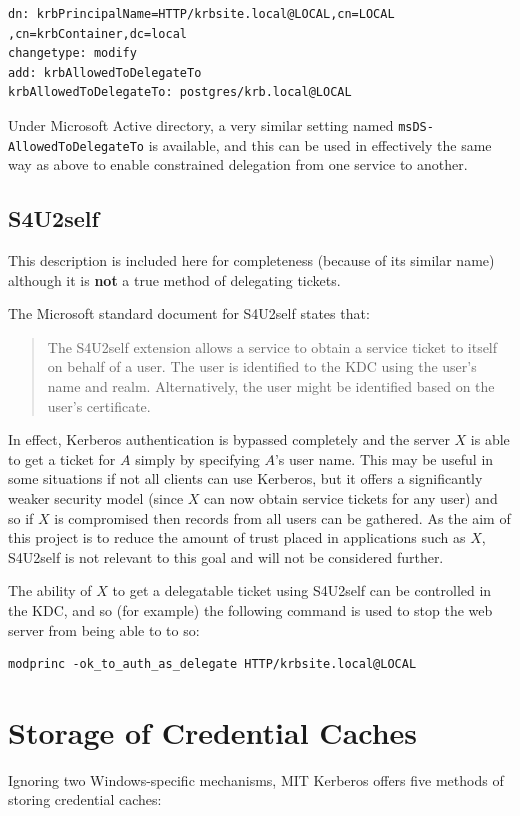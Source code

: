 \documentclass{report}
\begin{document}
\begin{verbatim}
dn: krbPrincipalName=HTTP/krbsite.local@LOCAL,cn=LOCAL
,cn=krbContainer,dc=local
changetype: modify
add: krbAllowedToDelegateTo
krbAllowedToDelegateTo: postgres/krb.local@LOCAL
\end{verbatim}

Under Microsoft Active directory, a very similar setting named \texttt{msDS-AllowedToDelegateTo} is available, and this can be used in effectively the same way as above to enable constrained delegation from one service to another\cite{MS-deleg-attribute}.

\subsection{S4U2self}
This description is included here for completeness (because of its similar name) although it is \textbf{not} a true method of delegating tickets.

The Microsoft standard document for S4U2self\cite{MS-s4u2} states that:

\begin{quote}
  The S4U2self extension allows a service to obtain a service ticket to itself on behalf of a user. The user is identified to the KDC using the user's name and realm. Alternatively, the user might be identified based on the user's certificate.
\end{quote}

In effect, Kerberos authentication is bypassed completely and the server $X$ is able to get a ticket for $A$ simply by specifying $A$'s user name. This may be useful in some situations if not all clients can use Kerberos, but it offers a significantly weaker security model (since $X$ can now obtain service tickets for any user) and so if $X$ is compromised then records from all users can be gathered. As the aim of this project is to reduce the amount of trust placed in applications such as $X$, S4U2self is not relevant to this goal and will not be considered further.

The ability of $X$ to get a delegatable ticket using S4U2self can be controlled in the KDC, and so (for example) the following command is used to stop the web server from being able to to so:

\begin{verbatim}
modprinc -ok_to_auth_as_delegate HTTP/krbsite.local@LOCAL
\end{verbatim}

\section{Storage of Credential Caches}
\label{sec:storage_of_credential_caches}
Ignoring two Windows-specific mechanisms, MIT Kerberos offers five methods of storing credential caches\cite{MIT-ccache-types}:
\end{document}

